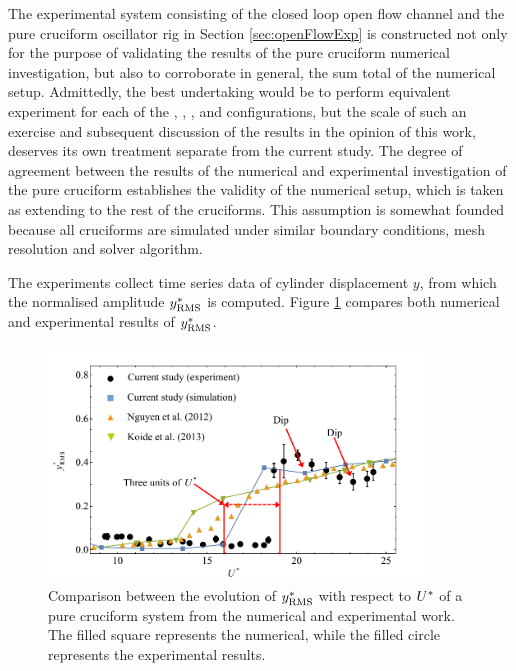 \documentclass[oneside]{utmthesis}
\begin{document}
The experimental system consisting of the closed loop open flow channel and the pure cruciform oscillator rig in Section \ref{sec:openFlowExp} is constructed not only for the purpose of validating the results of the pure cruciform numerical investigation, but also to corroborate in general, the sum total of the numerical setup. Admittedly, the best undertaking would be to perform equivalent experiment for each of the \angfi{}, \angfo{}, \angth{}, \angtw{} and \angon{} configurations, but the scale of such an exercise and subsequent discussion of the results in the opinion of this work, deserves its own treatment separate from the current study. The degree of agreement between the results of the numerical and experimental investigation of the pure cruciform establishes the validity of the numerical setup, which is taken as extending to the rest of the cruciforms. This assumption is somewhat founded because all cruciforms are simulated under similar boundary conditions, mesh resolution and solver algorithm.

The experiments collect time series data of cylinder displacement $y$, from which the normalised \rms{} amplitude $y^{*}_{\text{RMS}}$ is computed. Figure \ref{fig:expCompareAmp} compares both numerical and experimental results of $y^{*}_{\text{RMS}}$.

\begin{figure}[!h]
  \centering
  \includegraphics[width=0.9\textwidth]{figs/expCompareAmp}
  \caption{Comparison between the evolution of $y^{*}_{\text{RMS}}$ with respect to $U^{*}$ of a pure cruciform system from the numerical and experimental work. The filled square represents the numerical, while the filled circle represents the experimental results.}
  \label{fig:expCompareAmp}
\end{figure}
\end{document}
